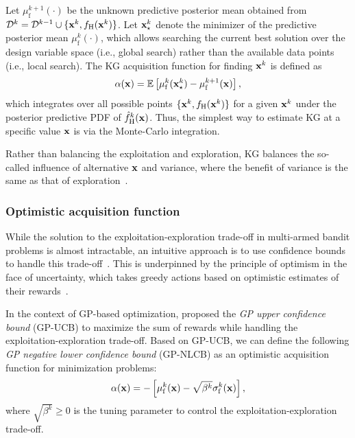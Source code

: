 \documentclass[journal ]{new-aiaa}
\begin{document}
	Let $\mu_\text{f}^{k+1}({\cdot})$ be the unknown predictive posterior mean obtained from $\mathcal{D}^{k} = \mathcal{D}^{k-1} \cup \{{\bf x}^{k},f_\text{H}({\bf x}^{k})\}$.
	Let ${\bf x}_{\star}^k$ denote the minimizer of the predictive posterior mean $\mu_\text{f}^k({\cdot})$, which allows searching the current best solution over the design variable space (i.e., global search) rather than the available data points (i.e., local search).
	The KG acquisition function for finding ${\bf x}^k$ is defined as~\citep{Frazier2008}
	\begin{equation}\label{eqn41}
		\alpha({\bf x}) = \mathbb{E}\left[\mu_\text{f}^k({\bf x}_{\star}^k)-\mu_\text{f}^{k+1}({\bf x})\right],
	\end{equation}
	which integrates over all possible points $\{{\bf x}^k,f_\text{H}({\bf x}^k)\}$ for a given ${\bf x}^k$ under the posterior predictive PDF of $\hat{f}_\text{H}^k({\bf x})$.
	Thus, the simplest way to estimate KG at a specific value ${\bf x}$ is via the Monte-Carlo integration.
	
	Rather than balancing the exploitation and exploration, KG balances the so-called influence of alternative ${\bf x}$ and variance, where the benefit of variance is the same as that of exploration~\citep{Frazier2008}.
	
	\subsubsection{Optimistic acquisition function}\label{Sec512}
	
	While the solution to the exploitation-exploration trade-off in multi-armed bandit problems is almost intractable, an intuitive approach is to use confidence bounds to handle this trade-off~\citep{Lai1985,Auer2002}.
	This is underpinned by the principle of optimism in the face of uncertainty,
	which takes greedy actions based on optimistic estimates of their rewards~\citep{Shahriari2016}.
	
	In the context of GP-based optimization, \citet{Srinivas2010} proposed the \textit{GP upper confidence bound} (GP-UCB) to maximize the sum of rewards while handling the exploitation-exploration trade-off.
	Based on GP-UCB, we can define the following \textit{GP negative lower confidence bound} (GP-NLCB) as an optimistic acquisition function for minimization problems:
	\begin{equation}\label{eqn42}
		\alpha({\bf x}) = -\left[\mu_\text{f}^k({\bf x})-\sqrt{\beta^k} \sigma_\text{f}^k({\bf x})\right],
	\end{equation}
	where $\sqrt{\beta^k} \geq 0$ is the tuning parameter to control the exploitation-exploration trade-off.
	
\end{document}
